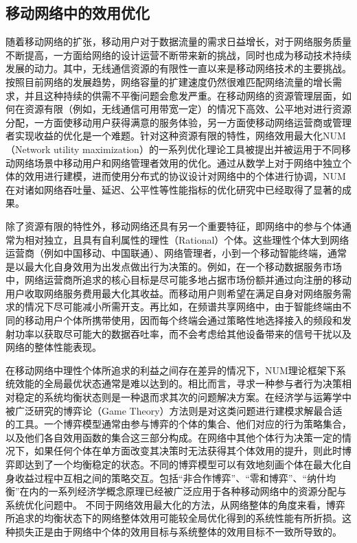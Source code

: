 
\subsection{移动网络中的效用优化}

随着移动网络的扩张，移动用户对于数据流量的需求日益增长，对于网络服务质量不断提高，一方面给网络的设计运营不断带来新的挑战，同时也成为移动技术持续发展的动力。其中，无线通信资源的有限性一直以来是移动网络技术的主要挑战。按照目前网络的发展趋势，网络容量的扩建速度仍然很难匹配网络流量的增长需求，并且这种持续的供需不平衡问题会愈发严重。在移动网络的资源管理层面，如何在资源有限（例如，无线通信可用带宽一定）的情况下高效、公平地对进行资源分配，一方面使移动用户获得满意的服务体验，另一方面使移动网络运营商或管理者实现收益的优化是一个难题。针对这种资源有限的特性，网络效用最大化NUM（Network utility maximization）的一系列优化理论工具被提出并被运用于不同移动网络场景中移动用户和网络管理者效用的优化。通过从数学上对于网络中独立个体的效用进行建模，进而使用分布式的协议设计对网络中的个体进行协调，NUM在对诸如网络吞吐量、延迟、公平性等性能指标的优化研究中已经取得了显著的成果\cite{NET}。

除了资源有限的特性外，移动网络还具有另一个重要特征，即网络中的参与个体通常为相对独立，且具有自利属性的理性（Rational）个体。这些理性个体大到网络运营商（例如中国移动、中国联通）、网络管理者，小到一个移动智能终端，通常是以最大化自身效用为出发点做出行为决策的。例如，在一个移动数据服务市场中，网络运营商所追求的核心目标是尽可能多地占据市场份额并通过向注册的移动用户收取网络服务费用最大化其收益。而移动用户则希望在满足自身对网络服务需求的情况下尽可能减小所需开支。再比如，在频谱共享网络中，由于智能终端由不同的移动用户个体所携带使用，因而每个终端会通过策略性地选择接入的频段和发射功率以获取尽可能大的数据吞吐率，而不会考虑给其他设备带来的信号干扰以及网络的整体性能表现。

在移动网络中理性个体所追求的利益之间存在差异的情况下，NUM理论框架下系统效能的全局最优状态通常是难以达到的。相比而言，寻求一种参与者行为决策相对稳定的系统均衡状态则是一种退而求其次的问题解决方案。在经济学与运筹学中被广泛研究的博弈论（Game Theory）方法则是对这类问题进行建模求解最合适的工具。一个博弈模型通常由参与博弈的个体的集合、他们对应的行为策略集合，以及他们各自效用函数的集合这三部分构成。在网络中其他个体行为决策一定的情况下，如果任何个体在单方面改变其决策时无法获得其个体效用的提升，则此时博弈即达到了一个均衡稳定的状态。不同的博弈模型可以有效地刻画个体在最大化自身收益过程中互相之间的策略交互。包括“非合作博弈”、“零和博弈”、“纳什均衡”在内的一系列经济学概念原理\cite{osborne}已经被广泛应用于各种移动网络中的资源分配与系统优化问题中\cite{han2012game}。
不同于网络效用最大化的方法，从网络整体的角度来看，博弈所追求的均衡状态下的网络整体效用可能较全局优化得到的系统性能有所折损。这种损失正是由于网络中个体的效用目标与系统整体的效用目标不一致所导致的。

